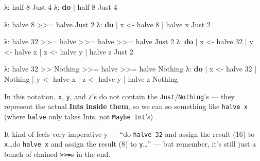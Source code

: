 \documentclass[]{article}
\newenvironment{Shaded}{}{}
\newcommand{\KeywordTok}[1]{\textcolor[rgb]{0.00,0.44,0.13}{\textbf{{#1}}}}
\newcommand{\DataTypeTok}[1]{\textcolor[rgb]{0.56,0.13,0.00}{{#1}}}
\newcommand{\DecValTok}[1]{\textcolor[rgb]{0.25,0.63,0.44}{{#1}}}
\newcommand{\OtherTok}[1]{\textcolor[rgb]{0.00,0.44,0.13}{{#1}}}
\newcommand{\FunctionTok}[1]{\textcolor[rgb]{0.02,0.16,0.49}{{#1}}}
\newcommand{\NormalTok}[1]{{#1}}
\begin{document}
\begin{Shaded}
\begin{Highlighting}[]
\NormalTok{λ}\FunctionTok{:} \NormalTok{half }\DecValTok{8}
\DataTypeTok{Just} \DecValTok{4}
\NormalTok{λ}\FunctionTok{:} \KeywordTok{do}
 \FunctionTok{|}     \NormalTok{half }\DecValTok{8}
\DataTypeTok{Just} \DecValTok{4}

\NormalTok{λ}\FunctionTok{:} \NormalTok{halve }\DecValTok{8} \FunctionTok{>>=} \NormalTok{halve}
\DataTypeTok{Just} \DecValTok{2}
\NormalTok{λ}\FunctionTok{:} \KeywordTok{do}
 \FunctionTok{|}     \NormalTok{x }\OtherTok{<-} \NormalTok{halve }\DecValTok{8}
 \FunctionTok{|}     \NormalTok{halve x}
\DataTypeTok{Just} \DecValTok{2}

\NormalTok{λ}\FunctionTok{:} \NormalTok{halve }\DecValTok{32} \FunctionTok{>>=} \NormalTok{halve }\FunctionTok{>>=} \NormalTok{halve }\FunctionTok{>>=} \NormalTok{halve}
\DataTypeTok{Just} \DecValTok{2}
\NormalTok{λ}\FunctionTok{:} \KeywordTok{do}
 \FunctionTok{|}     \NormalTok{x }\OtherTok{<-} \NormalTok{halve }\DecValTok{32}
 \FunctionTok{|}     \NormalTok{y }\OtherTok{<-} \NormalTok{halve x}
 \FunctionTok{|}     \NormalTok{z }\OtherTok{<-} \NormalTok{halve y}
 \FunctionTok{|}     \NormalTok{halve z}
\DataTypeTok{Just} \DecValTok{2}

\NormalTok{λ}\FunctionTok{:} \NormalTok{halve }\DecValTok{32} \FunctionTok{>>} \DataTypeTok{Nothing} \FunctionTok{>>=} \NormalTok{halve }\FunctionTok{>>=} \NormalTok{halve}
\DataTypeTok{Nothing}
\NormalTok{λ}\FunctionTok{:} \KeywordTok{do}
 \FunctionTok{|}     \NormalTok{x }\OtherTok{<-} \NormalTok{halve }\DecValTok{32}
 \FunctionTok{|}     \DataTypeTok{Nothing}
 \FunctionTok{|}     \NormalTok{y }\OtherTok{<-} \NormalTok{halve x}
 \FunctionTok{|}     \NormalTok{z }\OtherTok{<-} \NormalTok{halve y}
 \FunctionTok{|}     \NormalTok{halve z}
\DataTypeTok{Nothing}
\end{Highlighting}
\end{Shaded}

In this notation, \texttt{x}, \texttt{y}, and \texttt{z}'s do not
contain the \texttt{Just}/\texttt{Nothing}'s --- they represent the
actual \textbf{Ints inside them}, so we can so something like
\texttt{halve\ x} (where \texttt{halve} only takes Ints, not
\texttt{Maybe\ Int}'s)

It kind of feels very imperative-y --- ``do \texttt{halve\ 32} and
assign the result (16) to \texttt{x}\ldots{}do \texttt{halve\ x} and
assign the result (8) to \texttt{y}\ldots{}'' --- but remember, it's
still just a bunch of chained \texttt{\textgreater{}\textgreater{}=}s in
the end.
\end{document}
